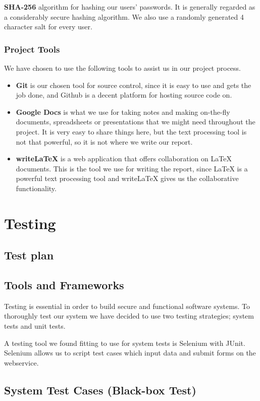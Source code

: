 \documentclass[a4paper]{article}
\begin{document}
\textbf{SHA-256} algorithm for hashing our users' passwords. It is generally regarded as a considerably secure hashing algorithm.
We also use a randomly generated 4 character salt for every user.

\subsubsection{Project Tools}
We have chosen to use the following tools to assist us in our project process.
\begin{itemize}
\item \textbf{Git} is our chosen tool for source control, since it is easy to use and gets the job done, and Github is a decent platform for hosting source code on.
\item \textbf{Google Docs} is what we use for taking notes and making on-the-fly documents, spreadsheets or presentations that we might need throughout the project. It is very easy to share things here, but the text processing tool is not that powerful, so it is not where we write our report.
\item \textbf{writeLaTeX} is a web application that offers collaboration on LaTeX documents. This is the tool we use for writing the report, since LaTeX is a powerful text processing tool and writeLaTeX gives us the collaborative functionality.
\end{itemize}


\section{Testing}

\subsection{Test plan}

\subsection{Tools and Frameworks}
Testing is essential in order to build secure and functional software systems. To thoroughly test our system we have decided to use two testing strategies; system tests and unit tests.

A testing tool we found fitting to use for system tests is Selenium with JUnit. Selenium allows us to script test cases which input data and submit forms on the webservice.

\subsection{System Test Cases (Black-box Test)}
\end{document}
